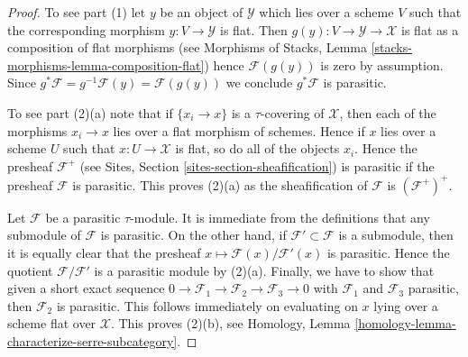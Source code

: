 \documentclass[10pt,a4paper]{amsart}
\theoremstyle{plain}
\theoremstyle{definition}
\theoremstyle{remark}
\numberwithin{equation}{subsection}
\begin{document}
\begin{proof}
To see part (1) let $y$ be an object of $\mathcal{Y}$ which lies
over a scheme $V$ such that the corresponding morphism $y : V \to \mathcal{Y}$
is flat. Then $g(y) : V \to \mathcal{Y} \to \mathcal{X}$ is flat
as a composition of flat morphisms (see
Morphisms of Stacks, Lemma \ref{stacks-morphisms-lemma-composition-flat})
hence $\mathcal{F}(g(y))$ is zero by assumption. Since
$g^*\mathcal{F} = g^{-1}\mathcal{F}(y) = \mathcal{F}(g(y))$ we conclude
$g^*\mathcal{F}$ is parasitic.

\medskip\noindent
To see part (2)(a) note that if $\{x_i \to x\}$ is a $\tau$-covering
of $\mathcal{X}$, then each of the morphisms $x_i \to x$ lies
over a flat morphism of schemes. Hence if $x$ lies over a scheme
$U$ such that $x : U \to \mathcal{X}$ is flat, so do all of the
objects $x_i$. Hence the presheaf $\mathcal{F}^+$ (see
Sites, Section \ref{sites-section-sheafification})
is parasitic if the presheaf $\mathcal{F}$ is
parasitic. This proves (2)(a) as the sheafification of $\mathcal{F}$
is $(\mathcal{F}^+)^+$.

\medskip\noindent
Let $\mathcal{F}$ be a parasitic $\tau$-module. It is immediate from the
definitions that any submodule of $\mathcal{F}$ is parasitic. On the other
hand, if $\mathcal{F}' \subset \mathcal{F}$ is a submodule, then it is
equally clear that the presheaf
$x \mapsto \mathcal{F}(x)/\mathcal{F}'(x)$
is parasitic. Hence the quotient $\mathcal{F}/\mathcal{F}'$ is a parasitic
module by (2)(a). Finally, we have to show that given a short exact sequence
$0 \to \mathcal{F}_1 \to \mathcal{F}_2 \to \mathcal{F}_3 \to 0$
with $\mathcal{F}_1$ and $\mathcal{F}_3$ parasitic, then $\mathcal{F}_2$
is parasitic. This follows immediately on evaluating on $x$ lying
over a scheme flat over $\mathcal{X}$. This proves (2)(b), see
Homology, Lemma \ref{homology-lemma-characterize-serre-subcategory}.


\end{proof}
\end{document}
